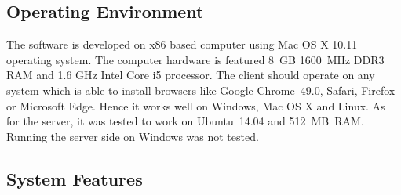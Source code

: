 \subsection{Operating Environment}

The software is developed on x86 based computer using Mac OS X 10.11 operating system. The
computer hardware is featured 8~GB 1600~MHz DDR3 RAM and 1.6 GHz Intel Core i5 processor.
The client should operate on any system which is able to install browsers like Google Chrome~49.0,
Safari, Firefox or Microsoft Edge. Hence it works well on Windows, Mac OS X and Linux. As for the
server, it was tested to work on Ubuntu~14.04 and 512~MB~RAM. Running the server side on Windows
was not tested.

\subsection{System Features}

